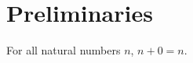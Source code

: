 \section{Preliminaries}
\begin{lemma}\label{lem:aux}
For all natural numbers $n$, $n + 0 = n$.
\end{lemma}
